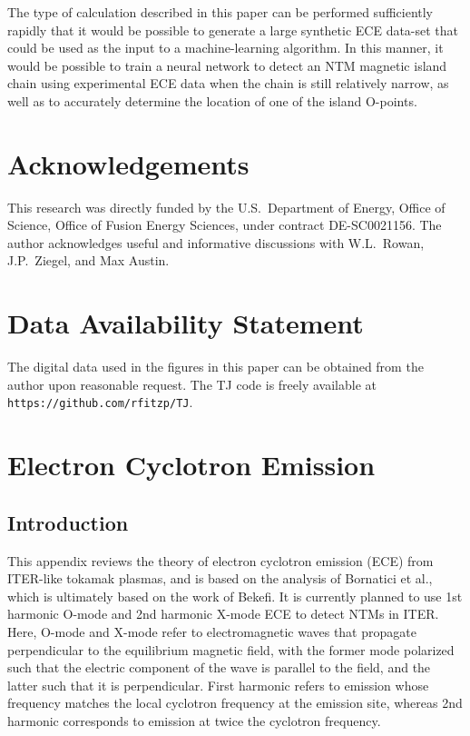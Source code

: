 \documentclass[12pt,prb,aps]{revtex4-1}
\begin{document}
The type of calculation described in this paper can be performed sufficiently rapidly that it would be possible to generate a large synthetic ECE data-set
that could be used as the input to a machine-learning algorithm. In this manner, it would be possible to train a neural network to  detect an NTM magnetic
island chain using experimental ECE data when the chain is still relatively narrow, as well as to accurately determine the location of one of the island O-points. 

\section*{Acknowledgements}
This research was directly funded by the U.S.\ Department of Energy, Office of Science, Office of Fusion Energy Sciences, under  contract DE-SC0021156. 
The author acknowledges useful and informative discussions with W.L.~Rowan, J.P.~Ziegel, and Max Austin.

\section*{Data Availability Statement}
The digital data used in the figures in this paper can be obtained from the author upon reasonable request. The TJ code is freely 
available at {\tt https://github.com/rfitzp/TJ}. 

\appendix
\section{Electron Cyclotron Emission}\label{sece}
\subsection{Introduction}
This appendix reviews the theory of electron cyclotron emission (ECE) from ITER-like tokamak plasmas, and is based on the analysis of Bornatici et al.,\cite{bornatici}
which is ultimately based on the work of Bekefi.\cite{bekefi}
It is  currently planned to use 1st harmonic O-mode  and 2nd harmonic X-mode ECE  to detect NTMs in ITER.\cite{ece4a} Here, O-mode and
X-mode refer to electromagnetic waves that propagate perpendicular to the equilibrium magnetic field, with the former mode polarized such that the electric component of
the wave is parallel to the field, and the latter such that it is perpendicular.\cite{plasma} First harmonic refers to emission whose frequency matches the local
cyclotron frequency at the emission site, whereas 2nd harmonic corresponds to emission at twice the cyclotron frequency.\cite{plasma}
\end{document}
